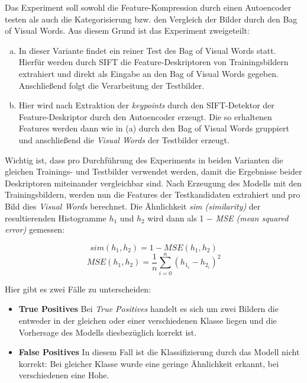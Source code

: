 Das Experiment soll sowohl die Feature-Kompression durch einen Autoencoder testen als auch die Kategorisierung bzw. den Vergleich der Bilder durch den Bag of Visual Words. Aus diesem Grund ist das Experiment zweigeteilt: 

\begin{enumerate}[(a)]%
	\item In dieser Variante findet ein reiner Test des Bag of Visual Words statt. Hierfür werden durch SIFT die Feature-Deskriptoren von Trainingsbildern extrahiert und direkt als Eingabe an den Bag of Visual Words gegeben. Anschließend folgt die Verarbeitung der Testbilder.
	\item Hier wird nach Extraktion der \textit{keypoints} durch den SIFT-Detektor der Feature-Deskriptor durch den Autoencoder erzeugt. Die so erhaltenen Features werden dann wie in (a) durch den Bag of Visual Words gruppiert und anschließend die \textit{Visual Words} der Testbilder erzeugt.
\end{enumerate}

Wichtig ist, dass pro Durchführung des Experiments in beiden Varianten die gleichen Trainings- und Testbilder verwendet werden, damit die Ergebnisse beider Deskriptoren miteinander vergleichbar sind. \newline
Nach Erzeugung des Modells mit den Trainingsbildern, werden nun die Features der Testkandidaten extrahiert und pro Bild dies \textit{Visual Words} berechnet. Die Ähnlichkeit \textit{sim (similarity)} der resultierenden Histogramme $h_1$ und $h_2$ wird dann als 1 $-$ \textit{MSE (mean squared error)} gemessen:

$$sim(h_1, h_2) = 1 - MSE(h_1, h_2)$$
$$MSE(h_1, h_2) = \frac{1}{n}\sum_{i=0}^{n}(h_{1_i} - h_{2_i})^{2}$$

 Hier gibt es zwei Fälle zu unterscheiden:

\begin{itemize}
	\item \textbf{True Positives} Bei \textit{True Positives} handelt es sich um zwei Bildern die entweder in der gleichen oder einer verschiedenen Klasse liegen und die Vorhersage des Modells diesbezüglich korrekt ist.
	\item \textbf{False Positives} In diesem Fall ist die Klassifizierung durch das Modell nicht korrekt: Bei gleicher Klasse wurde eine geringe Ähnlichkeit erkannt, bei verschiedenen eine Hohe.
\end{itemize}

